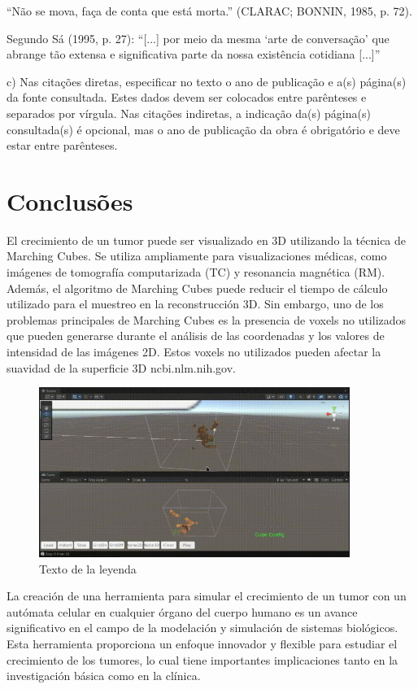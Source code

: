 \documentclass[a4paper,11pt]{article}
\begin{document}
{\vskip 0.2cm
``Não se mova, faça de conta que está morta.'' (CLARAC; BONNIN, 1985, p. 72).

\vskip 0.2cm
Segundo Sá (1995, p. 27): ``[...] por meio da mesma `arte de conversação' que abrange tão extensa e significativa parte da nossa existência cotidiana [...]''

\vskip 0.2cm
c) Nas citações diretas, especificar no texto o ano de publicação e a(s) página(s) da fonte consultada. Estes dados devem ser colocados entre parênteses e separados por vírgula. Nas citações indiretas, a indicação da(s) página(s) consultada(s) é opcional, mas o ano de publicação da obra é obrigatório e deve estar entre parênteses.


\section*{Conclusões}

El crecimiento de un tumor puede ser visualizado en 3D utilizando la técnica de Marching Cubes. Se utiliza ampliamente para visualizaciones médicas, como imágenes de tomografía computarizada (TC) y resonancia magnética (RM). Además, el algoritmo de Marching Cubes puede reducir el tiempo de cálculo utilizado para el muestreo en la reconstrucción 3D. Sin embargo, uno de los problemas principales de Marching Cubes es la presencia de voxels no utilizados que pueden generarse durante el análisis de las coordenadas y los valores de intensidad de las imágenes 2D. Estos voxels no utilizados pueden afectar la suavidad de la superficie 3D ncbi.nlm.nih.gov.

\begin{figure}[h]
  \centering
  \includegraphics[width=0.9\textwidth]{tumor.jpg}
  \caption{Texto de la leyenda}
\end{figure}

La creación de una herramienta para simular el crecimiento de un tumor con un autómata celular en cualquier órgano del cuerpo humano es un avance significativo en el campo de la modelación y simulación de sistemas biológicos. Esta herramienta proporciona un enfoque innovador y flexible para estudiar el crecimiento de los tumores, lo cual tiene importantes implicaciones tanto en la investigación básica como en la clínica.

}
\end{document}
